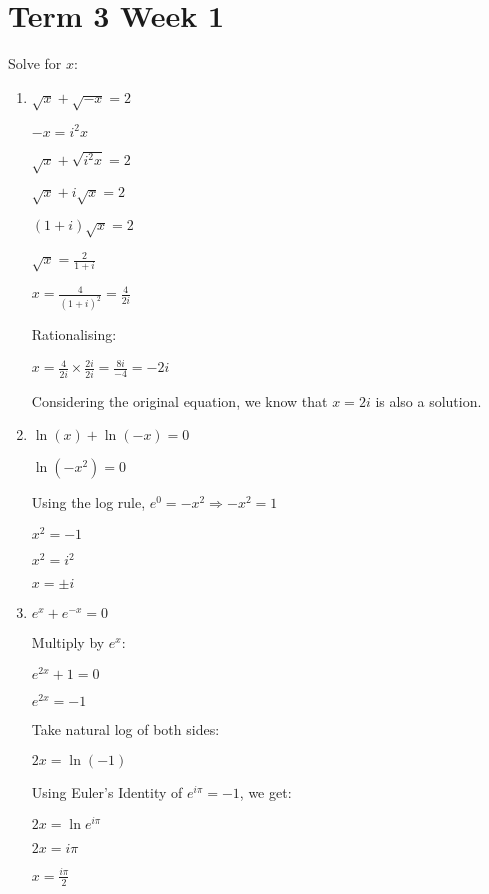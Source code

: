 \documentclass[../main.tex]{subfiles}
\begin{document}
\section*{Term 3 Week 1}
Solve for $x$:
\begin{enumerate}[itemsep=1cm]
    \item 
    $\sqrt{x}+\sqrt{-x}=2$

    $-x = i^2x$

    $\sqrt{x}+\sqrt{i^2x}=2$

    $\sqrt{x}+i\sqrt{x}=2$

    $(1+i)\sqrt{x}=2$

    $\sqrt{x}=\frac{2}{1+i}$

    $x=\frac{4}{(1+i)^2}=\frac{4}{2i}$

    Rationalising:

    $x=\frac{4}{2i}\times \frac{2i}{2i}=\frac{8i}{-4}=-2i$

    Considering the original equation, we know that $x=2i$ is also a solution.

    \item 
    $\ln{(x)}+\ln{(-x)}=0$

    $\ln{(-x^2)}=0$

    Using the log rule, $e^0=-x^2 \Rightarrow -x^2=1$

    $x^2 = -1$

    $x^2=i^2$

    $x = \pm i$

    \item 
    $e^x+e^{-x}=0$

    Multiply by $e^x$:

    $e^{2x}+1=0$

    $e^{2x}=-1$

    Take natural log of both sides:

    $2x=\ln{(-1)}$

    Using Euler's Identity of $e^{i\pi}=-1$, we get:

    $2x=\ln{e^{i\pi}}$

    $2x=i\pi$

    $x=\frac{i\pi}{2}$

    


    \end{enumerate}
\end{document}
